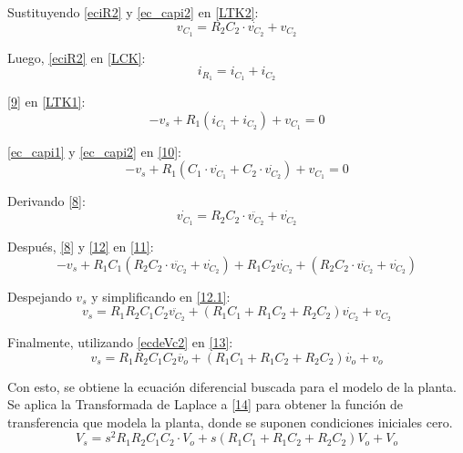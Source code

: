 Sustituyendo \eqref{eciR2} y \eqref{ec_capi2} en \eqref{LTK2}:
\begin{equation}
     v_{C_1} = R_2 C_2 \cdot \dot{v_{C_2}} + {v_{C_2}}
    \label{8}
\end{equation}

Luego, \eqref{eciR2} en \eqref{LCK}:
\begin{equation}
    i_{R_1} = i_{C_1} + i_{C_2}
    \label{9}
\end{equation}

\eqref{9} en \eqref{LTK1}:
\begin{equation}
    -v_s + R_1 (i_{C_1} + i_{C_2}) + v_{C_1} = 0
    \label{10}
\end{equation}

\eqref{ec_capi1} y \eqref{ec_capi2} en \eqref{10}:
\begin{equation}
    -v_s +R_1(C_1 \cdot \dot{v_{C_1}} + C_2 \cdot \dot{v_{C_2}}) + v_{C_1} = 0
    \label{11}
\end{equation}

Derivando \eqref{8}:
\begin{equation}
    \dot{v_{C_1}} = R_2 C_2 \cdot \ddot{v_{C_2}} + \dot{v_{C_2}}
    \label{12}
\end{equation}

Después, \eqref{8} y \eqref{12} en \eqref{11}:
\begin{equation}
    -v_s + R_1 C_1 (R_2 C_2 \cdot \ddot{v_{C_2}} + \dot{v_{C_2}}) + R_1 C_2 \dot{v_{C_2}} + (R_2 C_2 \cdot \ddot{v_{C_2}} + \dot{v_{C_2}})
    \label{12.1}
\end{equation}

Despejando $v_s$ y simplificando en \eqref{12.1}:
\begin{equation}
    v_s = R_1 R_2 C_1 C_2  \ddot{v_{C_2}} + (R_1 C_1 + R_1 C_2 + R_2 C_2)\dot{v_{C_2}} + v_{C_2}
    \label{13}
\end{equation}

Finalmente, utilizando \eqref{ecdeVc2} en \eqref{13}:
\begin{equation}
     v_s = R_1 R_2 C_1 C_2 \ddot{v_{o}} + (R_1 C_1 + R_1 C_2 + R_2 C_2)\dot{v_{o}} + v_{o}
     \label{14}
\end{equation}

Con esto, se obtiene la ecuación diferencial buscada para el modelo de la planta.
Se aplica la Transformada de Laplace a \eqref{14} para obtener la función de transferencia que modela la planta, donde se suponen condiciones iniciales cero.
\begin{equation}
    V_s = s^2 R_1 R_2 C_1 C_2  \cdot V_{o} + s(R_1 C_1 + R_1 C_2 + R_2 C_2)V_{o} + V_{o}
    \label{15}
\end{equation}

